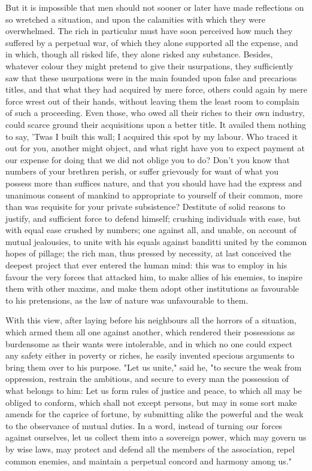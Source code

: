 \documentclass[11pt,twocolumn]{ltugboat}
\begin{document}
But it is impossible that men should not sooner or later have made
reflections on so wretched a situation, and upon the calamities with
which they were overwhelmed. The rich in particular must have soon
perceived how much they suffered by a perpetual war, of which they
alone supported all the expense, and in which, though all risked life,
they alone risked any substance. Besides, whatever colour they might
pretend to give their usurpations, they sufficiently saw that these
usurpations were in the main founded upon false and precarious titles,
and that what they had acquired by mere force, others could again by
mere force wrest out of their hands, without leaving them the least
room to complain of such a proceeding. Even those, who owed all their
riches to their own industry, could scarce ground their acquisitions
upon a better title. It availed them nothing to say, 'Twas I built
this wall; I acquired this spot by my labour. Who traced it out for
you, another might object, and what right have you to expect payment
at our expense for doing that we did not oblige you to do? Don't you
know that numbers of your brethren perish, or suffer grievously for
want of what you possess more than suffices nature, and that you
should have had the express and unanimous consent of mankind to
appropriate to yourself of their common, more than was requisite for
your private subsistence? Destitute of solid reasons to justify, and
sufficient force to defend himself; crushing individuals with ease,
but with equal ease crushed by numbers; one against all, and unable,
on account of mutual jealousies, to unite with his equals against
banditti united by the common hopes of pillage; the rich man, thus
pressed by necessity, at last conceived the deepest project that ever
entered the human mind: this was to employ in his favour the very
forces that attacked him, to make allies of his enemies, to inspire
them with other maxims, and make them adopt other institutions as
favourable to his pretensions, as the law of nature was unfavourable
to them.

With this view, after laying before his neighbours all the horrors of
a situation, which armed them all one against another, which rendered
their possessions as burdensome as their wants were intolerable, and
in which no one could expect any safety either in poverty or riches,
he easily invented specious arguments to bring them over to his
purpose. "Let us unite," said he, "to secure the weak from
oppression, restrain the ambitious, and secure to every man the
possession of what belongs to him: Let us form rules of justice and
peace, to which all may be obliged to conform, which shall not except
persons, but may in some sort make amends for the caprice of fortune,
by submitting alike the powerful and the weak to the observance of
mutual duties. In a word, instead of turning our forces against
ourselves, let us collect them into a sovereign power, which may
govern us by wise laws, may protect and defend all the members of the
association, repel common enemies, and maintain a perpetual concord
and harmony among us."
\end{document}

